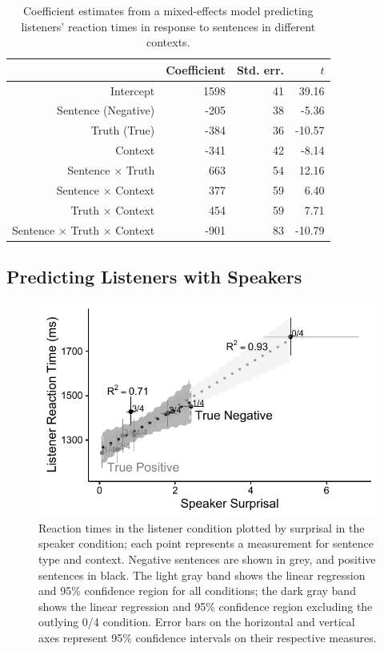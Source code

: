 \documentclass[man, noapacite]{apa2}
\begin{document}
\begin{table}[t]
\caption{\label{tab:listenermodel} Coefficient estimates from a mixed-effects model predicting listeners' reaction times in response to sentences in different contexts.}
\begin{center}
\begin{tabular}{rrrr}
  \hline
 & Coefficient & Std. err. & $t$ \\ 
  \hline
Intercept & 1598 & 41 & 39.16 \\ 
  Sentence (Negative) & -205 & 38 & -5.36  \\ 
  Truth (True) & -384 & 36 & -10.57 \\
  Context & -341 & 42 & -8.14 \\ 
  Sentence $\times$ Truth & 663 & 54 & 12.16 \\
  Sentence $\times$ Context & 377 & 59 & 6.40 \\
  Truth $\times$ Context & 454 & 59 & 7.71 \\
  Sentence $\times$ Truth $\times$ Context & -901 & 83 & -10.79 \\
   \hline
\end{tabular}
\vspace{-1.5cm}
\end{center}
\end{table}


\subsection{Predicting Listeners with Speakers}

\begin{figure}[t]
\begin{center} 
\includegraphics[width=5in]{figures/surprisal_rt_v2.pdf}
\caption{\label{fig:scatter} Reaction times in the listener condition plotted by surprisal in the speaker condition; each point represents a measurement for sentence type and context. Negative sentences are shown in grey, and positive sentences in black. The light gray band shows the linear regression and  95\% confidence region for all conditions; the dark gray band shows the linear regression and 95\% confidence region excluding the outlying 0/4 condition.  Error bars on the horizontal and vertical axes represent 95\% confidence intervals on their respective measures.}
\end{center} 
\end{figure}
\end{document}
